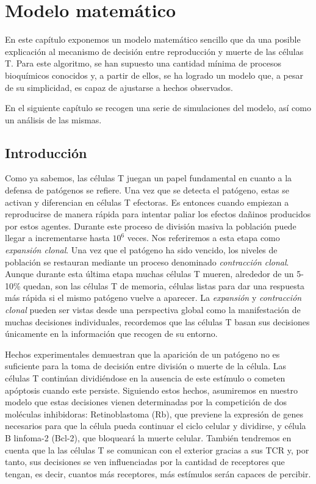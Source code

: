 \chapter{Modelo matemático}
\label{cap:descripcionTrabajo}

En este capítulo exponemos un modelo matemático sencillo que da una posible explicación al mecanismo de decisión entre reproducción y muerte de las células T. Para este algoritmo, se han supuesto una cantidad mínima de procesos bioquímicos conocidos y, a partir de ellos, se ha logrado un modelo que, a pesar de su simplicidad, es capaz de ajustarse a hechos observados. 

En el siguiente capítulo se recogen una serie de simulaciones del modelo, así como un análisis de las mismas. 

\section{Introducción}
\label{sec:intro_cap3}

Como ya sabemos, las células T juegan un papel fundamental en cuanto a la defensa de patógenos se refiere. Una vez que se detecta el patógeno, estas se activan y diferencian en células T efectoras. Es entonces cuando empiezan a  reproducirse de manera rápida para intentar paliar los efectos dañinos producidos por estos agentes. Durante este proceso de división masiva la población puede llegar a incrementarse hasta $10^6$ veces. Nos referiremos a esta etapa como \textit{expansión clonal}. Una vez que el patógeno ha sido vencido, los niveles de población se restauran mediante un proceso denominado \textit{contracción clonal}. Aunque durante esta última etapa muchas células T mueren, alrededor de un 5-10\% quedan, son las células T de memoria, células listas para dar una respuesta más rápida si el mismo patógeno vuelve a aparecer. La \textit{expansión} y \textit{contracción clonal} pueden ser vistas desde una perspectiva global como la manifestación de muchas decisiones individuales, recordemos que las células T basan sus decisiones únicamente en la información que recogen de su entorno.

Hechos experimentales demuestran que la aparición de un patógeno no es suficiente para la toma de decisión entre división o muerte de la célula. Las células T continúan dividiéndose en la ausencia de este estímulo o cometen apóptosis cuando este persiste. 
Siguiendo estos hechos, asumiremos en nuestro modelo que estas decisiones vienen determinadas por la competición de dos moléculas inhibidoras: Retinoblastoma (Rb), que previene la expresión de genes necesarios para que la célula pueda continuar el ciclo celular y dividirse, y célula B linfoma-2 (Bcl-2), que bloqueará la muerte celular. También tendremos en cuenta que la las células T se comunican con el exterior gracias a sus TCR y, por tanto, sus decisiones se ven influenciadas por la cantidad de receptores que tengan, es decir, cuantos más receptores, más estímulos serán capaces de percibir.


